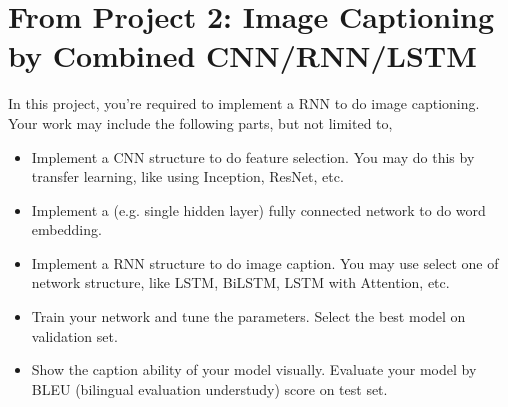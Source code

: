 \documentclass[11pt]{article}
\begin{document}
%
%
%
%

\section{From Project 2: Image Captioning by Combined CNN/RNN/LSTM}
In this project, you're required to implement a RNN to do image captioning. Your work may include the following parts, but not limited to, 

\begin{itemize}
\item Implement a CNN structure to do feature selection. You may do this by transfer learning, like using Inception, ResNet, etc.
\item Implement a (e.g. single hidden layer) fully connected network to do word embedding.
\item Implement a RNN structure to do image caption. You may use select one of network structure, like LSTM, BiLSTM, LSTM with Attention, etc.
\item Train your network and tune the parameters. Select the best model on validation set.
\item Show the caption ability of your model visually. Evaluate your model by BLEU (bilingual evaluation understudy) score on test set.
\end{itemize}
\end{document}
